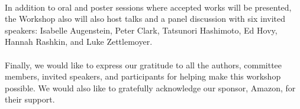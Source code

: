 \\
In addition to oral and poster sessions where accepted works will be presented, the Workshop also will also host talks and a panel discussion with six invited speakers: Isabelle Augenstein, Peter Clark, Tatsunori Hashimoto, Ed Hovy, Hannah Rashkin, and Luke Zettlemoyer. \\
\\
Finally, we would like to express our gratitude to all the authors, committee members, invited speakers, and participants for helping make this workshop possible. We would also like to gratefully acknowledge our sponsor, Amazon, for their support.\\
